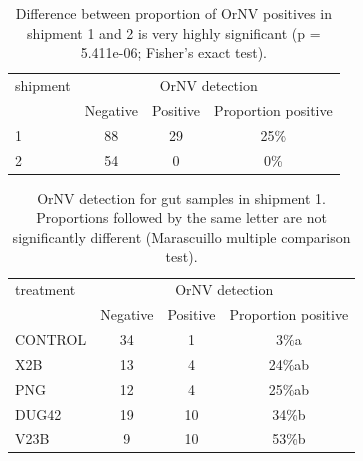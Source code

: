 \documentclass[12pt,letterpaper,english,bibliography=totocnumbered, abstract=on]{scrartcl}
\begin{document}
\begin{table}[H]
	\centering
	\caption{Difference between proportion of OrNV positives in shipment 1 and 2 is very highly significant (p = 5.411e-06; Fisher's exact test).}
	\label{diff_between_shipments}
	\begin{tabular}{lccc}
		\hline
		shipment  & \multicolumn{3}{c}{OrNV detection} \\ \cline{2-4}
		& Negative & Positive & Proportion positive\\
		\hline
		1    & 88 & 29 & 25\% \\
		2    & 54 & 0  &  0\% \\
		\hline
	\end{tabular}
\end{table}

\begin{table}[H]
	\centering
	\caption{OrNV detection for gut samples in shipment 1. Proportions followed by the same letter are not significantly different (Marascuillo multiple comparison test).}
	\label{ornv detection}
	\begin{tabular}{lccc}
		\hline
		treatment  & \multicolumn{3}{c}{OrNV detection} \\ \cline{2-4}
		& Negative & Positive & Proportion positive \\
		\hline
		CONTROL    & 34 & 1 & 3\%a  \\
		X2B        & 13 & 4 & 24\%ab \\
		PNG        & 12 & 4 & 25\%ab \\		
		DUG42      & 19 & 10 & 34\%b \\
		V23B       & 9  & 10 & 53\%b  \\
		\hline
	\end{tabular}
\end{table}
\end{document}
